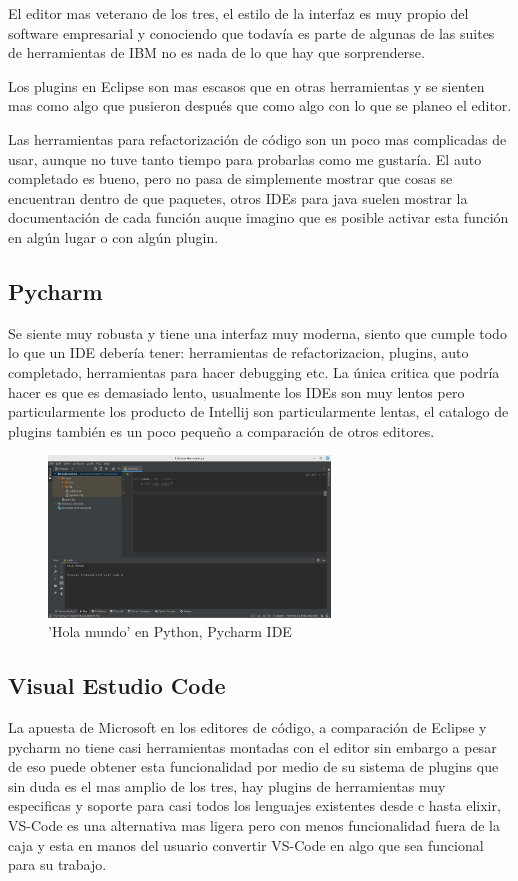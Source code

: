 \documentclass[12pt]{article}
\begin{document}
El editor mas veterano de los tres, el estilo de la interfaz es muy propio del software empresarial y conociendo que todavía es parte de algunas de las suites de herramientas de IBM no es nada de lo que hay que sorprenderse.

Los plugins en Eclipse son mas escasos que en otras herramientas y se sienten mas como algo que pusieron después que como algo con lo que se planeo el editor. 

Las herramientas para refactorización de código son un poco mas complicadas de usar, aunque no tuve tanto tiempo para probarlas como me gustaría. El auto completado es bueno, pero no pasa de simplemente mostrar que cosas se encuentran dentro de que paquetes, otros IDEs para java suelen mostrar la documentación de cada función auque imagino que es posible activar esta función en algún lugar o con algún plugin.  

\subsection*{Pycharm}
\label{sec:org420966b}
Se siente muy robusta y tiene una interfaz muy moderna, siento que cumple todo lo que un IDE debería tener: herramientas de refactorizacion, plugins, auto completado, herramientas para hacer debugging etc. La única critica que podría hacer es que es demasiado lento, usualmente los IDEs son muy lentos pero particularmente los producto de Intellij son particularmente lentas, el catalogo de plugins también es un poco pequeño a comparación de otros editores.

\begin{figure}[htbp]
\centering
\includegraphics[width=7.5cm]{./img/pycharm.png}
\caption{'Hola mundo' en Python, Pycharm IDE}
\end{figure}


\subsection*{Visual Estudio Code}
\label{sec:org592bdaa}
La apuesta de Microsoft en los editores de código, a comparación de Eclipse y pycharm no tiene casi herramientas montadas con el editor sin embargo a pesar de eso puede obtener esta funcionalidad por medio de su sistema de plugins que sin duda es el mas amplio de los tres, hay plugins de herramientas muy especificas y soporte para casi todos los lenguajes existentes desde c hasta elixir, VS-Code es una alternativa mas ligera pero con menos funcionalidad fuera de la caja y esta en manos del usuario convertir VS-Code en algo que sea funcional para su trabajo.
\end{document}
